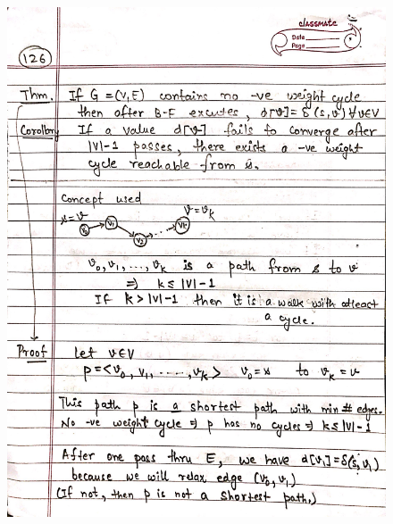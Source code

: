 \begin{figure}[H]
    \centering
    \includegraphics[scale=0.25]{"./MIT 6.006/MIT_6006_126"}
\end{figure}
\newpage
